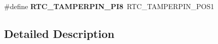 \begin{DoxyCompactItemize}
\item 
\hypertarget{group___h_a_l___r_t_c___aliased___defines_ga281fbac5fa3ba4677a329635519f2bb5}{\#define {\bfseries R\-T\-C\-\_\-\-T\-A\-M\-P\-E\-R\-P\-I\-N\-\_\-\-P\-I8}~R\-T\-C\-\_\-\-T\-A\-M\-P\-E\-R\-P\-I\-N\-\_\-\-P\-O\-S1}\label{group___h_a_l___r_t_c___aliased___defines_ga281fbac5fa3ba4677a329635519f2bb5}

\end{DoxyCompactItemize}


\subsection{Detailed Description}

